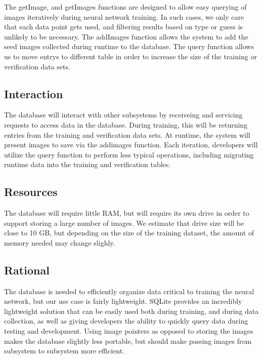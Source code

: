 The getImage, and getImages functions are designed to allow easy querying of images iteratively during neural network training. In such cases, we only care that each data point gets used, and filtering results based on type or guess is unlikely to be necessary.
The addImages function allows the system to add the seed images collected during runtime to the database.
The query function allows us to move entrys to different table in order to increase the size of the training or verification data sets. 

\subsection{Interaction}

The database will interact with other subsystems by receiveing and servicing requests to access data in the database. During training, this will be returning entries from the training and verification data sets. At runtime, the system will present images to save via the addimages function. Each iteration, developers will utilize the query function to perform less typical operations, including migrating runtime data into the training and verification tables.

\subsection{Resources}

The database will require little RAM, but will require its own drive in order to support storing a large number of images. We estimate that drive size will be close to 10 GB, but depending on the size of the training dataset, the amount of memory needed may change slighly.

\subsection{Rational}

The database is needed to efficiently organize data critical to training the neural network, but our use case is fairly lightweight.
SQLite provides an incredibly lightweight solution that can be easily used both during training, and during data collection, as well as giving 
developers the ability to quickly query data during testing and development. 
Using image pointers as opposed to storing the images makes the database slightly less portable, but should make passing images from subsystem
to subsystem more efficient.

